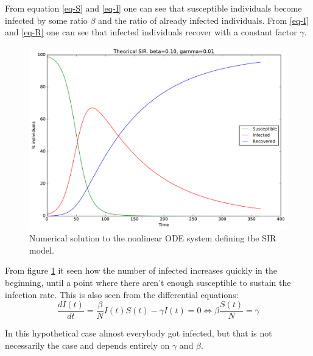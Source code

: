 From equation \eqref{eq-S} and \eqref{eq-I} one can see that susceptible individuals become infected by some ratio $\beta$ and the ratio of already infected individuals. From \eqref{eq-I} and \eqref{eq-R} one can see that infected individuals recover with a constant factor $\gamma$. 

\begin{figure}[H]
	\centering
	\includegraphics[width= 1.0 \linewidth]{plots/sir_one_region.pdf}
	\caption{Numerical solution to the nonlinear ODE system defining the SIR model.}
	\label{fig:sir_one_region}
\end{figure}

From figure \ref{fig:sir_one_region} it seen how the number of infected increases quickly in the beginning, until a point where there aren't enough susceptible to sustain the infection rate. This is also seen from the differential equations:
\begin{equation}
\frac{d I(t)}{dt} = \frac{\beta}{N} I(t) S(t) - \gamma I(t) = 0 \Leftrightarrow \beta\frac{S(t)}{N} = \gamma
\end{equation}

In this hypothetical case almost everybody got infected, but that is not necessarily the case and depends entirely on $\gamma$ and $\beta$.

